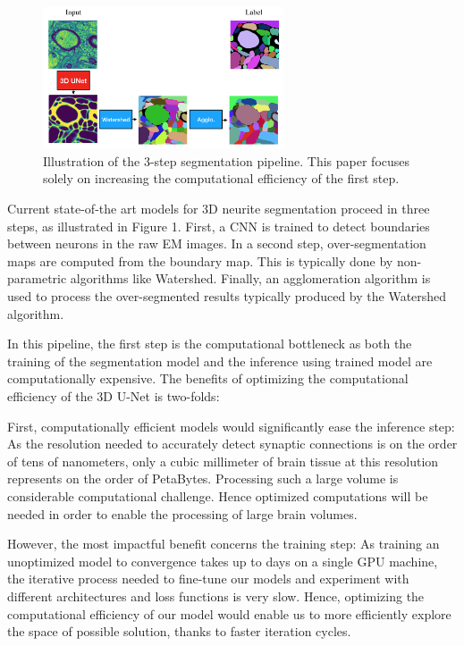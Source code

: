 \documentclass[runningheads]{llncs}
\begin{document}
\begin{figure}[h]
\centering
\includegraphics[width=2.8in]{Pipeline.png}
\caption{
Illustration of the 3-step segmentation pipeline. 
This paper focuses solely on increasing the computational efficiency of the first step.
}
\end{figure}

Current state-of-the art models for 3D neurite segmentation proceed in three steps, as illustrated in Figure 1. 
First, a CNN is trained to detect boundaries between neurons in the raw EM images. 
In a second step, over-segmentation maps are computed from the boundary map. 
This is typically done by non-parametric algorithms like Watershed. 
Finally, an agglomeration algorithm is used to process the over-segmented results typically produced by the Watershed algorithm. 

In this pipeline, the first step is the computational bottleneck as both the training of the segmentation model and the inference using trained model are computationally expensive. 
The benefits of optimizing the computational efficiency of the 3D U-Net is two-folds: 

First, computationally efficient models would significantly ease the inference step: 
As the resolution needed to accurately detect synaptic connections is on the order of tens of nanometers,
only a cubic millimeter of brain tissue at this resolution represents on the order of PetaBytes. 
Processing such a large volume is considerable computational challenge. 
Hence optimized computations will be needed in order to enable the processing of large brain volumes.

However, the most impactful benefit concerns the training step: 
As training an unoptimized model to convergence takes up to days on a single GPU machine, 
the iterative process needed to fine-tune our models 
and experiment with different architectures and loss functions is very slow. 
Hence, optimizing the computational efficiency of our model would enable us to more efficiently explore the space of possible solution, 
thanks to faster iteration cycles. 
\end{document}

